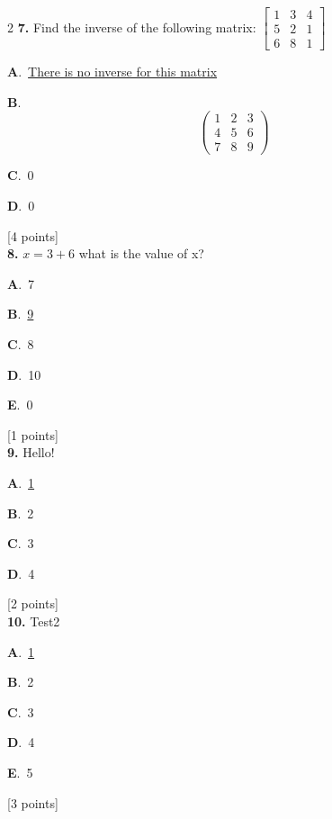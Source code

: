 \documentclass[12pt]{article}
\newcommand{\choice}[3]{%
  \noindent\textbf{#1}.~#2\hfill#3\par\vspace{0.25em}
}
\begin{document}
\begin{multicols}{2}
\noindent \textbf{\textenglish{7.}} {\textenglish{Find the inverse of the following matrix: }}\(\begin{bmatrix} 1 & 3 & 4 \\ 5 & 2 & 1 \\ 6 & 8 & 1 \end{bmatrix}\)

\noindent\choice{A}{\underline{{\textenglish{There is no inverse for this matrix}}}}{}
\noindent\choice{B}{\[\begin{pmatrix} 1 & 2 & 3 \\ 4 & 5 & 6 \\ 7 & 8 & 9  \end{pmatrix}\]}{}
\noindent\choice{C}{{\textenglish{0}}}{}
\noindent\choice{D}{{\textenglish{0}}}{}
\hfill {\textenglish{[4 points]}}\\[0.5em]

\noindent \textbf{\textenglish{8.}} \(x=3+6 \){\textenglish{ what is the value of x?}}

\noindent\choice{A}{{\textenglish{7}}}{}
\noindent\choice{B}{\underline{{\textenglish{9}}}}{}
\noindent\choice{C}{{\textenglish{8}}}{}
\noindent\choice{D}{{\textenglish{10}}}{}
\noindent\choice{E}{{\textenglish{0}}}{}
\hfill {\textenglish{[1 points]}}\\[0.5em]

\noindent \textbf{\textenglish{9.}} {\textenglish{Hello!}}

\noindent\choice{A}{\underline{{\textenglish{1}}}}{}
\noindent\choice{B}{{\textenglish{2}}}{}
\noindent\choice{C}{{\textenglish{3}}}{}
\noindent\choice{D}{{\textenglish{4}}}{}
\hfill {\textenglish{[2 points]}}\\[0.5em]

\noindent \textbf{\textenglish{10.}} {\textenglish{Test2}}

\noindent\choice{A}{\underline{{\textenglish{1}}}}{}
\noindent\choice{B}{{\textenglish{2}}}{}
\noindent\choice{C}{{\textenglish{3}}}{}
\noindent\choice{D}{{\textenglish{4}}}{}
\noindent\choice{E}{{\textenglish{5}}}{}
\hfill {\textenglish{[3 points]}}\\[0.5em]


\end{multicols}
\end{document}
